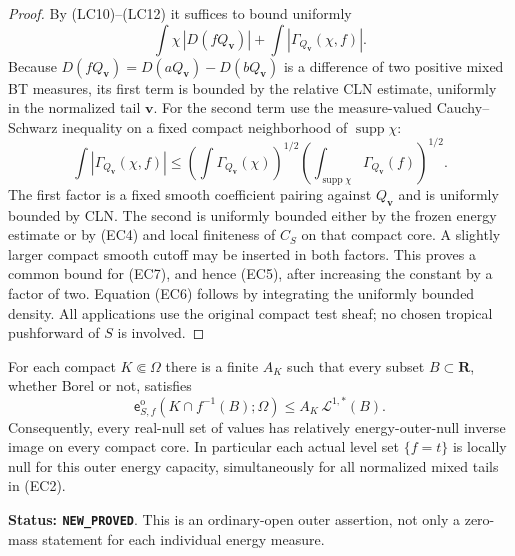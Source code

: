 \begin{proof}
By (LC10)--(LC12) it suffices to bound uniformly
\[
 \int\chi\,|D(fQ_{\mathbf v})|
                  +\int|\Gamma_{Q_{\mathbf v}}(\chi,f)|.
 \tag{EC7}
\]
Because $D(fQ_{\mathbf v})=D(aQ_{\mathbf v})-D(bQ_{\mathbf v})$
is a difference of two positive mixed BT measures, its first
term is bounded by the relative CLN estimate, uniformly in the
normalized tail $\mathbf v$.  For the second term use the
measure-valued Cauchy--Schwarz inequality on a fixed compact
neighborhood of $\operatorname{supp}\chi$:
\[
 \int|\Gamma_{Q_{\mathbf v}}(\chi,f)|
 \le
 \left(\int\Gamma_{Q_{\mathbf v}}(\chi)\right)^{1/2}
 \left(\int_{\operatorname{supp}\chi}
                                 \Gamma_{Q_{\mathbf v}}(f)\right)^{1/2}.
\]
The first factor is a fixed smooth coefficient pairing against
$Q_{\mathbf v}$ and is uniformly bounded by CLN.  The second
is uniformly bounded either by the frozen energy estimate or
by (EC4) and local finiteness of $C_S$ on that compact core.
A slightly larger compact smooth cutoff may be inserted in
both factors.  This proves a common bound for (EC7), and hence
(EC5), after increasing the constant by a factor of two.
Equation (EC6) follows by integrating the uniformly bounded
density.  All applications use the original compact test
sheaf; no chosen tropical pushforward of $S$ is involved.
\end{proof}

\begin{theorem}
\label{thm:r11-outer-coarea-capacity}
For each compact $K\Subset\Omega$ there is a finite $A_K$
such that every subset $B\subset\mathbf R$, whether Borel or
not, satisfies
\[
 \boxed{\quad
 \mathsf e_{S,f}^{\mathrm o}
                  (K\cap f^{-1}(B);\Omega)
                 \le A_K\,\mathcal L^{1,*}(B).
 \quad}
 \tag{EC8}
\]
Consequently, every real-null set of values has relatively
energy-outer-null inverse image on every compact core.  In
particular each actual level set $\{f=t\}$ is locally null
for this outer energy capacity, simultaneously for all
normalized mixed tails in (EC2).
\end{theorem}

\noindent\textbf{Status: \texttt{NEW\_PROVED}}.  This is an
ordinary-open outer assertion, not only a zero-mass statement
for each individual energy measure.

